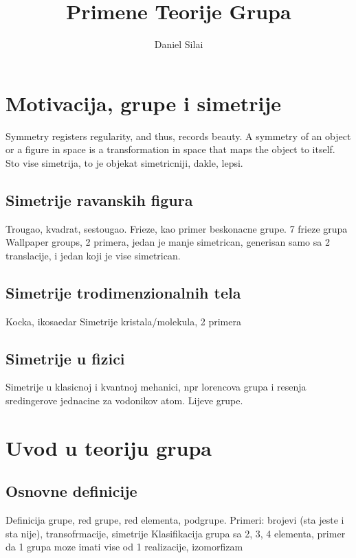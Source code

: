 \documentclass[times, utf8, diplomski]{fer}
\begin{document}
\title{Primene Teorije Grupa}

\author{Daniel Sila\dj i}

\maketitle


\zahvala{}

\tableofcontents

\chapter{Motivacija, grupe i simetrije}
Symmetry registers regularity, and thus, records beauty.
A symmetry of an object or a figure in space is a transformation in space that maps the object to itself.
Sto vise simetrija, to je objekat simetricniji, dakle, lepsi.
\section{Simetrije ravanskih figura}
Trougao, kvadrat, sestougao.
Frieze, kao primer beskonacne grupe. 7 frieze grupa
Wallpaper groups, 2 primera, jedan je manje simetrican, generisan samo sa 2 translacije, i jedan koji je vise simetrican.
\section{Simetrije trodimenzionalnih tela}
Kocka, ikosaedar
Simetrije kristala/molekula, 2 primera
\section{Simetrije u fizici}
Simetrije u klasicnoj i kvantnoj mehanici, npr lorencova grupa i resenja sredingerove jednacine za vodonikov atom. Lijeve grupe.

\chapter{Uvod u teoriju grupa}
\section{Osnovne definicije}
Definicija grupe, red grupe, red elementa, podgrupe.
Primeri: brojevi (sta jeste i sta nije), transofrmacije, simetrije
Klasifikacija grupa sa 2, 3, 4 elementa, primer da 1 grupa moze imati vise od 1 realizacije, izomorfizam
\end{document}
